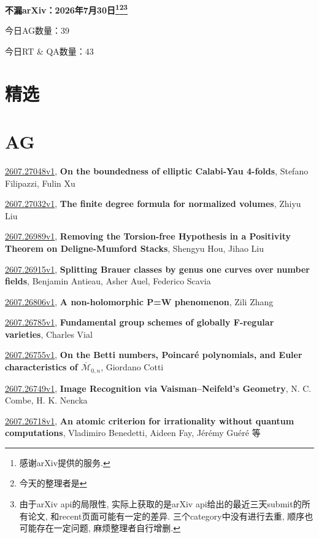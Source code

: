 \documentclass[9pt, a4paper]{article}
\theoremstyle{plain}
\theoremstyle{definition}
\theoremstyle{remark}
\newcommand{\arxiv}[3]{\href{https://arxiv.org/abs/#1}{#1}, \textbf{\textcolor{arxivblue}{#2}}, #3}
\newcommand{\AGnumber}{39}
\newcommand{\RTQAnumber}{43}
\newcommand{\NewestDate}{2026年7月30日}
\newcommand{\todayarXiver}{} %
\begin{document}
\begin{center}
    \Huge\textbf{不漏arXiv：\NewestDate\footnote{感谢arXiv提供的服务.}\footnote{今天的整理者是\todayarXiver}\footnote{由于arXiv api的局限性, 实际上获取的是arXiv api给出的最近三天submit的所有论文, 和recent页面可能有一定的差异. 三个category中没有进行去重, 顺序也可能存在一定问题, 麻烦整理者自行增删.}} \\
\end{center}

\setcounter{section}{-1}

\begin{center}
    今日AG数量：\AGnumber
    
    今日RT \& QA数量：\RTQAnumber
    
\end{center}


\section{精选}


\section{AG}
\arxiv{2607.27048v1}{On the boundedness of elliptic Calabi-Yau 4-folds}{Stefano Filipazzi, Fulin Xu}

\arxiv{2607.27032v1}{The finite degree formula for normalized volumes}{Zhiyu Liu}

\arxiv{2607.26989v1}{Removing the Torsion-free Hypothesis in a Positivity Theorem on Deligne-Mumford Stacks}{Shengyu Hou, Jihao Liu}

\arxiv{2607.26915v1}{Splitting Brauer classes by genus one curves over number fields}{Benjamin Antieau, Asher Auel, Federico Scavia}

\arxiv{2607.26806v1}{A non-holomorphic P=W phenomenon}{Zili Zhang}

\arxiv{2607.26785v1}{Fundamental group schemes of globally F-regular varieties}{Charles Vial}

\arxiv{2607.26755v1}{On the Betti numbers, Poincaré polynomials, and Euler characteristics of $\overline{\mathcal M}_{0,n}$}{Giordano Cotti}

\arxiv{2607.26749v1}{Image Recognition via Vaisman--Neifeld's Geometry}{N. C. Combe, H. K. Nencka}

\arxiv{2607.26718v1}{An atomic criterion for irrationality without quantum computations}{Vladimiro Benedetti, Aideen Fay, Jérémy Guéré 等}
\end{document}

